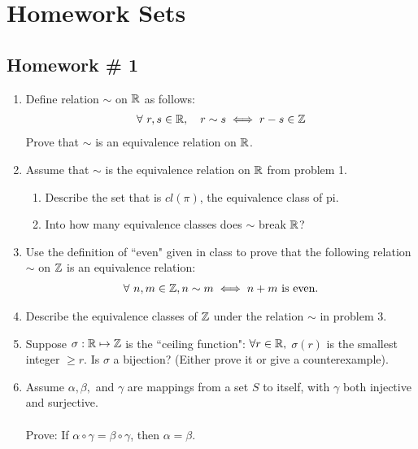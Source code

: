 
\chapter*{Homework Sets}
\addtocounter{chapter}{1} %
\section*{Homework \# 1 }
\begin{enumerate}
    \item Define relation $\sim$ on ${\mathbb{ R}}$ as follows:
    \begin{align}
        \forall \ r,s \in {\mathbb{ R}}, \ \ \ r\sim s \iff r-s\in {\mathbb{ Z}} \nonumber
    \end{align}
    Prove that $\sim$ is an equivalence relation on ${\mathbb{ R}}$.
    \item Assume that $\sim$ is the equivalence relation on ${\mathbb{ R}}$ from problem 1.
    \begin{enumerate}[label=\alph*)]
        \item Describe the set that is $cl(\pi)$, the equivalence class of pi.
        \item Into how many equivalence classes does $\sim$ break ${\mathbb{ R}}$?
    \end{enumerate}
    \item Use the definition of ``even" given in class to prove that the following relation $\sim$ on ${\mathbb{ Z}}$ is an equivalence relation:
    \begin{align}
        \forall \ n,m \in {\mathbb{ Z}}, n\sim m \iff n+m \text{ is even.}\nonumber
    \end{align}
    \item Describe the equivalence classes of ${\mathbb{ Z}}$ under the relation $\sim$ in problem 3.
    \item Suppose $\sigma : {\mathbb{ R}} \mapsto {\mathbb{ Z}}$ is the ``ceiling function": $\forall r\in {\mathbb{ R}},$ $\sigma(r)$ is the smallest integer $\geq r$. Is $\sigma$ a bijection? (Either prove it or give a counterexample).
    \item Assume $\alpha, \beta,$ and $\gamma$ are mappings from a set $S$ to itself, with $\gamma$ both injective and surjective. \\ \\
    Prove: If $\alpha \circ \gamma = \beta \circ \gamma$, then $\alpha = \beta$.
\end{enumerate}
\newpage

